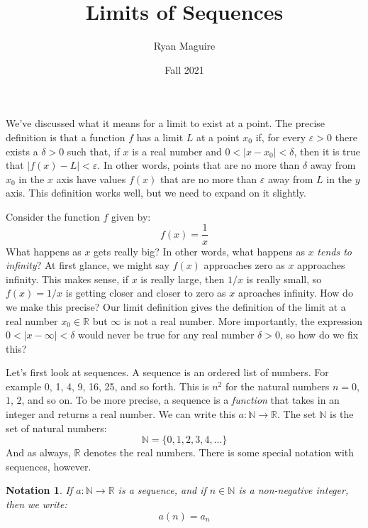 \documentclass{article}
\title{Limits of Sequences}
\author{Ryan Maguire}
\date{Fall 2021}
\theoremstyle{normal}
\newtheorem{notation}{Notation}
\theoremstyle{plain}
\begin{document}
    \maketitle
    We've discussed what it means for a limit to exist at a point. The precise
    definition is that a function $f$ has a limit $L$ at a point $x_{0}$ if,
    for every $\varepsilon>0$ there exists a $\delta>0$ such that, if $x$ is a
    real number and $0<|x-x_{0}|<\delta$, then it is true that
    $|f(x)-L|<\varepsilon$. In other words, points that are no more than
    $\delta$ away from $x_{0}$ in the $x$ axis have values $f(x)$ that are no
    more than $\varepsilon$ away from $L$ in the $y$ axis. This definition
    works well, but we need to expand on it slightly.
    \par\hfill\par
    Consider the function $f$ given by:
    \begin{equation}
        f(x)=\frac{1}{x}
    \end{equation}
    What happens as $x$ gets really big? In other words, what happens as
    $x$ \textit{tends to infinity}? At first glance, we might say $f(x)$
    approaches zero as $x$ approaches infinity. This makes sense, if $x$ is
    really large, then $1/x$ is really small, so $f(x)=1/x$ is getting closer
    and closer to zero as $x$ aproaches infinity. How do we make this precise?
    Our limit definition gives the definition of the limit at a real number
    $x_{0}\in\mathbb{R}$ but $\infty$ is not a real number. More importantly,
    the expression $0<|x-\infty|<\delta$ would never be true for any real
    number $\delta>0$, so how do we fix this?
    \par\hfill\par
    Let's first look at sequences. A sequence is an ordered list of numbers.
    For example 0, 1, 4, 9, 16, 25, and so forth. This is $n^{2}$ for the
    natural numbers $n=0$, $1$, $2$, and so on. To be more precise, a sequence
    is a \textit{function} that takes in an integer and returns a real number.
    We can write this $a:\mathbb{N}\rightarrow\mathbb{R}$. The set
    $\mathbb{N}$ is the set of natural numbers:
    \begin{equation}
        \mathbb{N}=\{0,1,2,3,4,\dots\}
    \end{equation}
    And as always, $\mathbb{R}$ denotes the real numbers. There is some special
    notation with sequences, however.
    \begin{notation}
        If $a:\mathbb{N}\rightarrow\mathbb{R}$ is a sequence, and if
        $n\in\mathbb{N}$ is a non-negative integer, then we write:
        \begin{equation}
            a(n)=a_{n}
        \end{equation}
    \end{notation}
\end{document}
